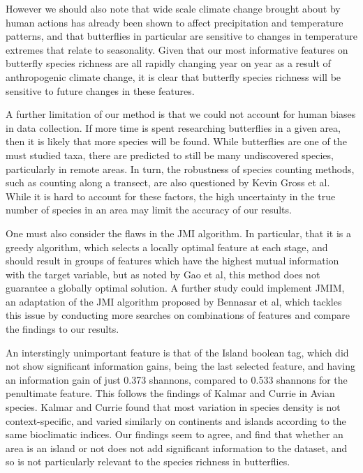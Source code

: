 \documentclass[prl,showpacs,superscriptaddress,twocolumn,longbibliography]{revtex4-1}
\begin{document}
However we should also note that wide scale climate change brought about by human actions has already been shown to affect precipitation and temperature patterns\cite{trenberth_changes_2011, ashton_effects_2009}, and that butterflies in particular are sensitive to changes in temperature extremes that relate to seasonality\cite{bauerfeind_simulating_2014}. Given that our most informative features on butterfly species richness are all rapidly changing year on year as a result of anthropogenic climate change\cite{loarie_velocity_2009}, it is clear that butterfly species richness will be sensitive to future changes in these features. 

A further limitation of our method is that we could not account for human biases in data collection. If more time is spent researching butterflies in a given area, then it is likely that more species will be found. While butterflies are one of the must studied taxa, there are predicted to still be many undiscovered species, particularly in remote areas. In turn, the robustness of species counting methods, such as counting along a transect, are also questioned by Kevin Gross et al\cite{gross_robustness_2007}. While it is hard to account for these factors, the high uncertainty in the true number of species in an area may limit the accuracy of our results.

One must also consider the flaws in the JMI algorithm. In particular, that it is a greedy algorithm, which selects a locally optimal feature at each stage, and should result in groups of features which have the highest mutual information with the target variable, but as noted by Gao et al, this method does not guarantee a globally optimal solution\cite{gao_variational_2016}.  A further study could implement JMIM, an adaptation of the JMI algorithm proposed by Bennasar et al\cite{bennasar_feature_2015}, which tackles this issue by conducting more searches on combinations of features and compare the findings to our results.

An interstingly unimportant feature is that of the Island boolean tag, which did not show significant information gains, being the last selected feature, and having an information gain of just 0.373 shannons, compared to 0.533 shannons for the penultimate feature. This follows the findings of Kalmar and Currie in Avian species\cite{kalmar_unified_2007}. Kalmar and Currie found that most variation in species density is not context-specific, and varied similarly on continents and islands according to the same bioclimatic indices. Our findings seem to agree, and find that whether an area is an island or not does not add significant information to the dataset, and so is not particularly relevant to the species richness in butterflies.
\end{document}
